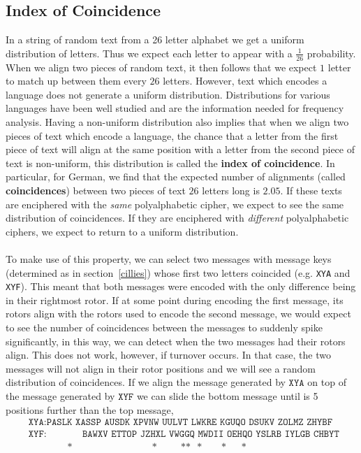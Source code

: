 \subsection{Index of Coincidence}\label{ioc}
In a string of random text from a 26 letter alphabet we get a uniform
distribution of letters. Thus we expect each letter to appear with a
$\frac{1}{26}$ probability. When we align two pieces of random text,
it then follows that we expect $1$ letter to match up between them
every $26$ letters. However, text which encodes a language does
not generate a uniform distribution. Distributions for various
languages have been well studied and are the information needed for
frequency analysis. Having a non-uniform distribution also implies
that when we align two pieces of text which encode a language, the
chance that a letter from the first piece of text will align at the
same position with a letter
from the second piece of text is non-uniform, this distribution is
called the {\bf{index of coincidence}}. In particular, for German, we
find that the expected number of alignments (called
	{\bf{coincidences}}) between two pieces of text $26$ letters long is
$2.05$. If these texts
are enciphered with the \emph{same} polyalphabetic cipher, we expect
to see the same distribution of coincidences. If they are enciphered
with \emph{different} polyalphabetic ciphers, we expect to return to
a uniform distribution.
\\\\To make use of this property, we can select two messages with
message keys (determined as in section~\ref{cillies}) whose first two
letters coincided (e.g. \texttt{XYA} and
\texttt{XYF}). This meant that both messages were encoded with the
only difference being in their rightmost rotor. If at some point
during encoding the first message, its rotors align with the rotors
used to encode the second message, we would expect to see the number
of coincidences between the messages to suddenly spike significantly,
in this way, we can detect when the two messages had their rotors
align. This does not work, however, if turnover occurs. In that case, the two
messages will not align in their rotor positions and we will see a
random distribution of coincidences. If we align the message
generated by $\texttt{XYA}$ on top of the message generated by
$\texttt{XYF}$ we can slide the bottom message until is 5 positions
further than the top message,
\begin{align*}
	 & \texttt{XYA}: \texttt{PASLK XASSP AUSDK XPVNW UULVT LWKRE KGUQO
		DSUKV ZOLMZ ZHYBF}
	\\
	 & \texttt{XYF}: \texttt{ }\texttt{ }\texttt{ }\texttt{ }\texttt{
	}\texttt{ }\texttt{BAWXV ETTOP JZHXL VWGGQ MWDII OEHQO YSLRB IYLGB
		CHBYT }
	\\
	 &
	\ \ \ \ \ \ \ \ \ \ \ \ \ \ \ \ \ \ \texttt{*}\ \ \ \ \ \ \ \ \ \ \ \ \ \ \ \ \ \ \ \ \ \ \ \ \ \ \ \ \ \ \ \ \ \ \ \ \ \texttt{*}\ \ \ \ \ \ \ \ \ \ \ \texttt{**}\ \ \ \texttt{*}\ \ \ \ \ \ \ \ \ \texttt{*}\ \ \ \ \ \ \ \texttt{*}
\end{align*}
